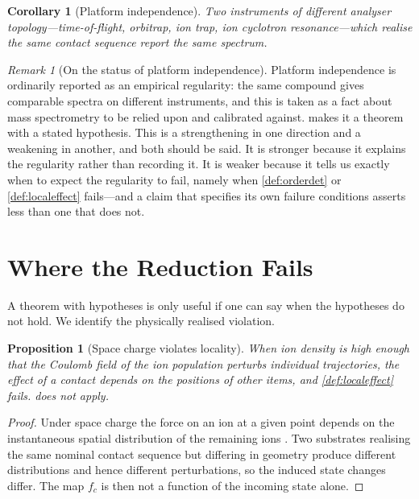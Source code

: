 \documentclass[11pt,a4paper]{article}
\theoremstyle{plain}
\newtheorem{proposition}[theorem]{Proposition}
\newtheorem{corollary}[theorem]{Corollary}
\theoremstyle{definition}
\theoremstyle{remark}
\newtheorem{remark}[theorem]{Remark}
\newcommand{\Cont}{c}
\begin{document}
\begin{corollary}[Platform independence]
\label{cor:platform}
Two instruments of different analyser topology---time-of-flight, orbitrap, ion
trap, ion cyclotron resonance---which realise the same contact sequence report
the same spectrum.
\end{corollary}

\begin{remark}[On the status of platform independence]
\label{rem:platformstatus}
Platform independence is ordinarily reported as an empirical regularity: the
same compound gives comparable spectra on different instruments, and this is
taken as a fact about mass spectrometry to be relied upon and calibrated
against.  makes it a theorem with a stated hypothesis. This
is a strengthening in one direction and a weakening in another, and both should
be said. It is stronger because it explains the regularity rather than
recording it. It is weaker because it tells us exactly when to expect the
regularity to fail, namely when \cref{def:orderdet} or \cref{def:localeffect}
fails---and a claim that specifies its own failure conditions asserts less than
one that does not.
\end{remark}

\section{Where the Reduction Fails}
\label{sec:failure}

A theorem with hypotheses is only useful if one can say when the hypotheses do
not hold. We identify the physically realised violation.

\begin{proposition}[Space charge violates locality]
\label{prop:spacecharge}
When ion density is high enough that the Coulomb field of the ion population
perturbs individual trajectories, the effect of a contact depends on the
positions of other items, and \cref{def:localeffect} fails. 
does not apply.
\end{proposition}

\begin{proof}
Under space charge the force on an ion at a given point depends on the
instantaneous spatial distribution of the remaining ions
\citep{guan1995space}. Two substrates realising the same nominal contact
sequence but differing in geometry produce different distributions and hence
different perturbations, so the induced state changes differ. The map
$f_\Cont$ is then not a function of the incoming state alone.
\end{proof}
\end{document}
